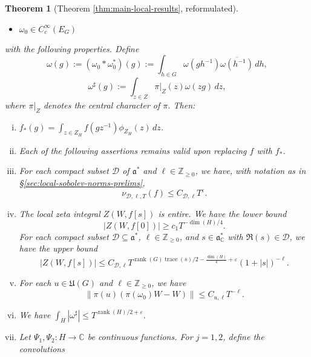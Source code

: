 \documentclass[reqno]{amsart}
\def\eps{\varepsilon}
\DeclareMathOperator{\trace}{trace}
\DeclareMathOperator{\rank}{rank}
\theoremstyle{plain} \newtheorem{theorem} {Theorem}
\theoremstyle{definition} \newtheorem{definition} [theorem] {Definition}
\theoremstyle{itplain} %
\numberwithin{equation}{section}
\numberwithin{theorem}{section}
\renewcommand{\geq}{\geqslant}
\renewcommand{\leq}{\leqslant}
\begin{document}
\begin{theorem}[Theorem \ref{thm:main-local-results}, reformulated]
\begin{itemize}
\item $\omega_0 \in C_c^\infty(E_G)$
\end{itemize}
with the following properties.  Define
\begin{equation*}
  \omega(g) := (\omega_0 \ast \omega_0^*)(g) := \int _{h \in G} \omega(g h^{-1}) \overline{\omega(h^{-1})} \, d h,
\end{equation*}
\begin{equation*}
  \omega^\sharp (g) := \int _{z \in Z}
  \pi|_Z (z) \omega(z g) \, d z,
\end{equation*}
where $\pi|_Z$ denotes the central character of $\pi$.  Then:
\begin{enumerate}[(i)]
\item $f_{\ast}(g) = \int _{z \in Z_H} f(g z^{-1}) \phi_{Z_H}(z) \, d z$.
\item Each of the following assertions remains valid upon replacing $f$ with $f_{\ast}$.
\item For each compact subset $\mathcal{D}$ of $\mathfrak{a}^*$ and $\ell \in \mathbb{Z}_{\geq 0}$, we have, with notation as in \S\ref{sec:local-sobolev-norms-prelims},
  \begin{equation*}
    \nu_{\mathcal{D},\ell,T}(f) \leq C_{\mathcal{D},\ell} T^\eps.
  \end{equation*}
\item The local zeta integral $Z(W,f[s])$ is entire.  We have the lower bound
  \begin{equation*}
    |Z(W,f[0])| \geq c_1 T^{- \dim(H)/4}.
  \end{equation*}
  For each compact subset $\mathcal{D} \subseteq \mathfrak{a}^*$, $\ell \in \mathbb{Z}_{\geq 0}$, and $s \in \mathfrak{a}_{\mathbb{C}}^*$ with $\Re(s) \in \mathcal{D}$, we have the upper bound
  \begin{equation*}
    |Z(W,f[s])| \leq C_{\mathcal{D},\ell} T ^{\rank(G) \trace(s)/2 - \frac{\dim(H)}{4} + \eps }
    (1 + |s|)^{-\ell}.
  \end{equation*}
\item For each $u \in \mathfrak{U}(G)$ and $\ell \in \mathbb{Z}_{\geq 0}$, we have
  \begin{equation*}
    \|\pi(u) ( \pi(\omega_0) W - W)\| \leq C_{u,\ell} T^{-\ell}.
  \end{equation*}
\item We have $\int_{H} |\omega^\sharp| \leq T^{\rank(H)/2 + \eps}$.
\item Let $\Psi_1, \Psi_2 : H \rightarrow \mathbb{C}$ be continuous functions.  For $j=1,2$, define the convolutions

\end{enumerate}
\end{theorem}
\end{document}
